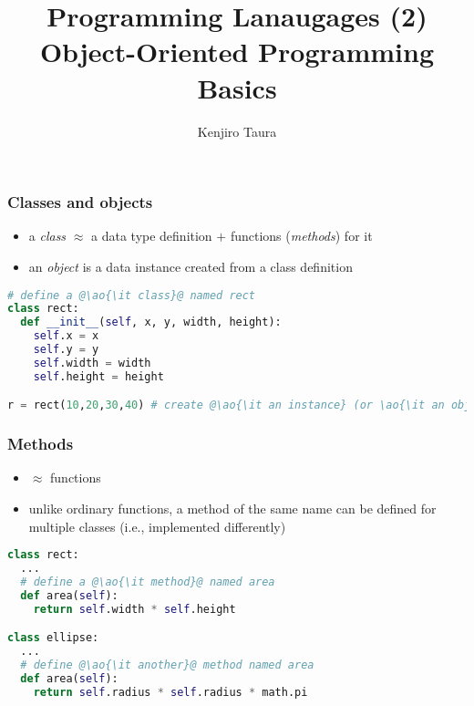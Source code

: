 \documentclass[12pt,dvipdfmx]{beamer}
\title{Programming Lanaugages (2) \\
Object-Oriented Programming Basics}
\institute{}
\author{Kenjiro Taura}
\date{}
\newcommand{\ao}[1]{{\color{blue}#1}}
\begin{document}
\maketitle


\begin{frame}[fragile]
  \frametitle{Classes and objects}

  \begin{itemize}
  \item a \ao{\it class} $\approx$ a data type definition $+$
    functions (\ao{\it methods}) for it
  \item an \ao{\it object} is a data instance created from a class definition
  \end{itemize}

  \begin{center}
\begin{lstlisting}[language=python]
# define a @\ao{\it class}@ named rect
class rect:
  def __init__(self, x, y, width, height):
    self.x = x
    self.y = y
    self.width = width
    self.height = height

r = rect(10,20,30,40) # create @\ao{\it an instance} (or \ao{\it an object}) of rect@
\end{lstlisting}
  \end{center}
\end{frame}

\begin{frame}[fragile]
  \frametitle{Methods}
  \begin{itemize}
  \item $\approx$ functions
  \item unlike ordinary functions, a method of the same name can be defined
    for multiple classes (i.e., implemented differently)
  \end{itemize}

  \begin{center}
\begin{lstlisting}[language=python]
class rect:
  ...
  # define a @\ao{\it method}@ named area
  def area(self):
    return self.width * self.height

class ellipse:
  ...
  # define @\ao{\it another}@ method named area
  def area(self):
    return self.radius * self.radius * math.pi
  \end{lstlisting}
\end{center}
\end{frame}
\end{document}
